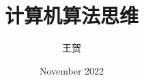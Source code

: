 \documentclass[a4paper,12pt]{ctexbook}
\begin{document}
\author{王贺}
\title{计算机算法思维}
\date{November 2022}

\frontmatter
\maketitle
\tableofcontents

\mainmatter



\backmatter
\end{document}
